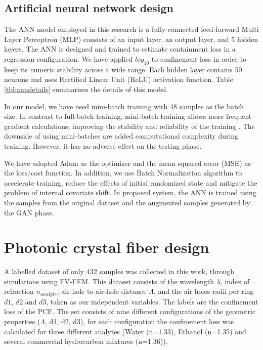 \documentclass[draft, 10pt]{IEEEtran}
\begin{document}
\subsection{Artificial neural network design}
\label{ssec:ann}

The ANN model employed in this research is a fully-connected feed-forward Multi Layer Perceptron (MLP) consists of an input layer, an output layer, and 5 hidden layers. The ANN is designed and trained to estimate containment loss in a regression configuration. We have applied $log_{10}$ to confinement loss in order to keep its numeric stability across a wide range. Each hidden layer contains 50 neurons and uses Rectified Linear Unit (ReLU) activation function. Table \ref{tbl:anndetails} summarizes the details of this model.

In our model, we have used mini-batch training with 48 samples as the batch size. In contrast to full-batch training, mini-batch training allows more frequent gradient calculations, improving the stability and reliability of the training \cite{masters2018revisiting, keskar2016large}. The downside of using mini-batches are added computational complexity during training. However, it has no adverse effect on the testing phase.

We have adopted Adam \cite{kingma2014adam} as the optimizer and the mean squared error (MSE) as the loss/cost function. In addition, we use Batch Normalization algorithm \cite{ioffe2015batch} to accelerate training, reduce the effects of initial randomized state and mitigate the problem of internal covariate shift. In proposed system, the ANN is trained using the samples from the original dataset and the augmented samples generated by the GAN phase.


\section{Photonic crystal fiber design}
\label{sec:pcf}

A labelled dataset of only 432 samples was collected in this work, through simulations using FV-FEM. This dataset consists of the wavelength $\lambda$, index of refraction $n_{analyte} $, air-hole to air-hole distance $ \Lambda $, and the air holes radii per ring $d1$, $d2$ and $d3$, taken as our independent variables. The labels are the confinement loss of the PCF. The set consists of nine different configurations of the geometric properties ($ \Lambda $, d1, d2, d3), for each configuration the confinement loss was calculated for three different analytes (Water (n=1.33), Ethanol (n=1.35) and several commercial hydrocarbon mixtures (n=1.36)).
\end{document}
